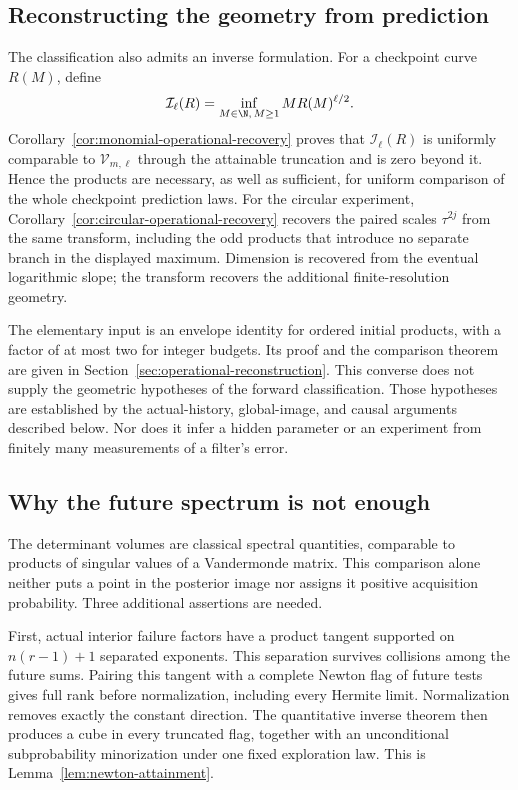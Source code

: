 \subsection{Reconstructing the geometry from prediction}
The classification also admits an inverse formulation. For a checkpoint
curve $R(M)$, define
\[
 \mathcal I_\ell(R)=\inf_{M\in\N,\,M\ge1}M R(M)^{\ell/2}.
\]
Corollary~\ref{cor:monomial-operational-recovery} proves that
$\mathcal I_\ell(R)$ is uniformly comparable to
$\mathcal V_{m,\ell}$ through the attainable truncation and is zero
beyond it. Hence the products are necessary, as well as sufficient,
for uniform comparison of the whole checkpoint prediction laws.
For the circular experiment, Corollary~\ref{cor:circular-operational-recovery}
recovers the paired scales $\tau^{2j}$ from the same transform, including
the odd products that introduce no separate branch in the displayed
maximum. Dimension is recovered from the eventual logarithmic slope;
the transform recovers the additional finite-resolution geometry.

The elementary input is an envelope identity for ordered initial
products, with a factor of at most two for integer budgets. Its proof
and the comparison theorem are given in
Section~\ref{sec:operational-reconstruction}. This converse does not
supply the geometric hypotheses of the forward classification. Those
hypotheses are established by the actual-history, global-image, and
causal arguments described below. Nor does it infer a hidden parameter
or an experiment from finitely many measurements of a filter's error.

\subsection{Why the future spectrum is not enough}
The determinant volumes are classical spectral quantities, comparable to
products of singular values of a Vandermonde matrix. This comparison
alone neither puts a point in the posterior image nor assigns it
positive acquisition probability. Three additional assertions are needed.

First, actual interior failure factors have a product tangent supported
on $n(r-1)+1$ separated exponents. This separation survives collisions
among the future sums. Pairing this tangent with a complete Newton flag
of future tests gives full rank before normalization, including every
Hermite limit. Normalization removes exactly the constant direction.
The quantitative inverse theorem then produces a cube in every truncated
flag, together with an unconditional subprobability minorization under
one fixed exploration law. This is Lemma~\ref{lem:newton-attainment}.

